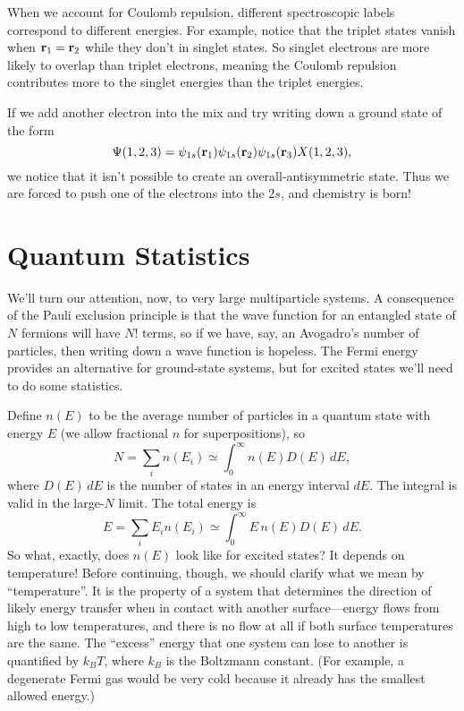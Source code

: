 \documentclass[../p052main.tex]{subfiles}
\begin{document}
When we account for Coulomb repulsion, different spectroscopic labels correspond to different energies.
For example, notice that the triplet states vanish when $\mathbf{r}_1 = \mathbf{r}_2$ while they don't in singlet states.
So singlet electrons are more likely to overlap than triplet electrons, meaning the Coulomb repulsion contributes more to the singlet energies than the triplet energies.

If we add another electron into the mix and try writing down a ground state of the form
\[ \Psi(1,2,3) = \psi_{1s}(\mathbf{r}_1)\psi_{1s}(\mathbf{r}_2)\psi_{1s}(\mathbf{r}_3) X(1,2,3), \]
we notice that it isn't possible to create an overall-antisymmetric state.
Thus we are forced to push one of the electrons into the $2s$, and chemistry is born!%

\section{Quantum Statistics}
We'll turn our attention, now, to very large multiparticle systems.
A consequence of the Pauli exclusion principle is that the wave function for an entangled state of $N$ fermions will have $N!$ terms, so if we have, say, an Avogadro's number of particles, then writing down a wave function is hopeless.
The Fermi energy provides an alternative for ground-state systems, but for excited states we'll need to do some statistics.

Define $n(E)$ to be the average number of particles in a quantum state with energy $E$ (we allow fractional $n$ for superpositions), so
\[ N = \sum_{i}^{} n(E_i) \simeq \int_{0}^{\infty} n(E) D(E) \,dE, \]
where $D(E) \,dE$ is the number of states in an energy interval $dE$.
The integral is valid in the large-$N$ limit.
The total energy is
\[ E = \sum_{i}^{} E_i n(E_i) \simeq \int_{0}^{\infty} E \,n(E) D(E) \,dE. \]
So what, exactly, does $n(E)$ look like for excited states?
It depends on temperature!
Before continuing, though, we should clarify what we mean by ``temperature''.
It is the property of a system that determines the direction of likely energy transfer when in contact with another surface---energy flows from high to low temperatures, and there is no flow at all if both surface temperatures are the same.
The ``excess'' energy that one system can lose to another is quantified by $k_B T$, where $k_B$ is the Boltzmann constant.
(For example, a degenerate Fermi gas would be very cold because it already has the smallest allowed energy.)
\end{document}
